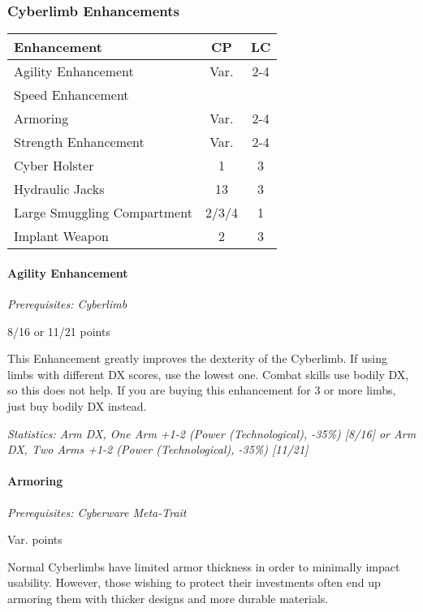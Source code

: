 \begin{multicols*}{3}
		
	\subsubsection{Cyberlimb Enhancements}
	
	\begin{center}
		\begin{tabularx}{0.32\textwidth}{|X|c|c|}
			\hline
			Enhancement & CP & LC\\
			\hline
			\hline
			Agility Enhancement & Var. & 2-4 \\
			Speed Enhancement & & \\
			Armoring & Var. & 2-4 \\
			Strength Enhancement & Var. & 2-4 \\
			Cyber Holster & 1 & 3 \\
			Hydraulic Jacks & 13 & 3 \\
			Large Smuggling Compartment & 2/3/4 & 1\\
			Implant Weapon & 2 & 3 \\
			\hline
		\end{tabularx}
	\end{center}
	
	\paragraph{Agility Enhancement}
	\textit{Prerequisites: Cyberlimb}
	\begin{flushright}
		8/16 or 11/21 points
	\end{flushright}
	
	This Enhancement greatly improves the dexterity of the Cyberlimb. If using limbs with different DX scores, use the lowest one. Combat skills use bodily DX, so this does not help. If you are buying this enhancement for 3 or more limbs, just buy bodily DX instead. 
	
	\textit{\textcolor{OliveGreen}{Statistics: Arm DX, One Arm +1-2 (Power (Technological), -35\%) [8/16] or Arm DX, Two Arms +1-2 (Power (Technological), -35\%) [11/21]}}
	
	\paragraph{Armoring}
	\textit{Prerequisites: Cyberware Meta-Trait}
	\begin{flushright}
		Var. points
	\end{flushright}
	
	Normal Cyberlimbs have limited armor thickness in order to minimally impact usability. However, those wishing to protect their investments often end up armoring them with thicker designs and more durable materials.
	

\end{multicols*}
